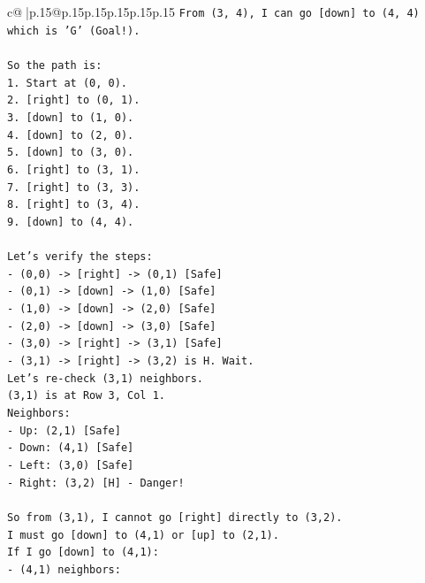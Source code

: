\documentclass{article}
\begin{document}
{\begin{supertabular}{c@{$\;$}|p{.15\linewidth}@{}p{.15\linewidth}p{.15\linewidth}p{.15\linewidth}p{.15\linewidth}p{.15\linewidth}}
{{{\texttt{From (3, 4), I can go {[}down{]} to (4, 4) which is 'G' (Goal!).} \\
\\ 
\texttt{So the path is:} \\
\texttt{1. Start at (0, 0).} \\
\texttt{2. {[}right{]} to (0, 1).} \\
\texttt{3. {[}down{]} to (1, 0).} \\
\texttt{4. {[}down{]} to (2, 0).} \\
\texttt{5. {[}down{]} to (3, 0).} \\
\texttt{6. {[}right{]} to (3, 1).} \\
\texttt{7. {[}right{]} to (3, 3).} \\
\texttt{8. {[}right{]} to (3, 4).} \\
\texttt{9. {[}down{]} to (4, 4).} \\
\\ 
\texttt{Let's verify the steps:} \\
\texttt{{-} (0,0) {-}> {[}right{]} {-}> (0,1) {[}Safe{]}} \\
\texttt{{-} (0,1) {-}> {[}down{]} {-}> (1,0) {[}Safe{]}} \\
\texttt{{-} (1,0) {-}> {[}down{]} {-}> (2,0) {[}Safe{]}} \\
\texttt{{-} (2,0) {-}> {[}down{]} {-}> (3,0) {[}Safe{]}} \\
\texttt{{-} (3,0) {-}> {[}right{]} {-}> (3,1) {[}Safe{]}} \\
\texttt{{-} (3,1) {-}> {[}right{]} {-}> (3,2) is H. Wait.} \\
\texttt{Let's re{-}check (3,1) neighbors.} \\
\texttt{(3,1) is at Row 3, Col 1.} \\
\texttt{Neighbors:} \\
\texttt{{-} Up: (2,1) {[}Safe{]}} \\
\texttt{{-} Down: (4,1) {[}Safe{]}} \\
\texttt{{-} Left: (3,0) {[}Safe{]}} \\
\texttt{{-} Right: (3,2) {[}H{]} {-} Danger!} \\
\\ 
\texttt{So from (3,1), I cannot go {[}right{]} directly to (3,2).} \\
\texttt{I must go {[}down{]} to (4,1) or {[}up{]} to (2,1).} \\
\texttt{If I go {[}down{]} to (4,1):} \\
\texttt{{-} (4,1) neighbors:} \\
}}}
\end{supertabular}}
\end{document}
